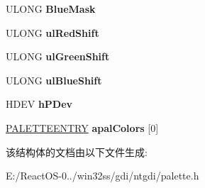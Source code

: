 \begin{DoxyCompactItemize}
\item 
\mbox{\label{struct___p_a_l_e_t_t_e_a14d17edb5887c28a210a2ce6734107fb}} 
U\+L\+O\+NG {\bfseries Blue\+Mask}
\item 
\mbox{\label{struct___p_a_l_e_t_t_e_ad341c5184d3be64749c6f5533b632a28}} 
U\+L\+O\+NG {\bfseries ul\+Red\+Shift}
\item 
\mbox{\label{struct___p_a_l_e_t_t_e_a3ae3fea827556b78e4322bcdae70ead3}} 
U\+L\+O\+NG {\bfseries ul\+Green\+Shift}
\item 
\mbox{\label{struct___p_a_l_e_t_t_e_ac88e954eb8240ad4bb0f74307db7e146}} 
U\+L\+O\+NG {\bfseries ul\+Blue\+Shift}
\item 
\mbox{\label{struct___p_a_l_e_t_t_e_a16a1cdb2a28e0394ba9a46e0ed431c10}} 
H\+D\+EV {\bfseries h\+P\+Dev}
\item 
\mbox{\label{struct___p_a_l_e_t_t_e_a5c54418c008c5011bc9da94b01dccf06}} 
\hyperlink{structtag_p_a_l_e_t_t_e_e_n_t_r_y}{P\+A\+L\+E\+T\+T\+E\+E\+N\+T\+RY} {\bfseries apal\+Colors} \mbox{[}0\mbox{]}
\end{DoxyCompactItemize}


该结构体的文档由以下文件生成\+:\begin{DoxyCompactItemize}
\item 
E\+:/\+React\+O\+S-\/0../win32ss/gdi/ntgdi/palette.\+h\end{DoxyCompactItemize}
